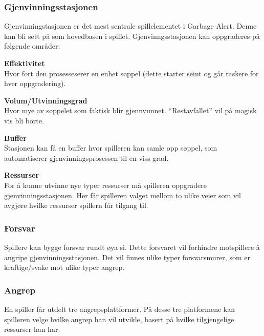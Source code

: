 \subsubsection{Gjenvinningsstasjonen}
Gjenvinningstasjonen er det mest sentrale spillelementet i Garbage
Alert. Denne kan bli sett på som hovedbasen i spillet.
Gjenvinngsstasjonen kan oppgraderes på følgende områder:\\
\begin{description}
	\item \textbf{Effektivitet}\\Hvor fort den prosesseserer en enhet søppel (dette starter seint og går raskere for hver oppgradering).
	\item \textbf{Volum/Utvinningsgrad}\\Hvor mye av søppelet som faktisk blir gjennvunnet. “Restavfallet” vil på magisk vis bli borte.
	\item \textbf{Buffer}\\Stasjonen kan få en buffer hvor spilleren kan samle opp søppel, som automatiserer gjenvinningsprosessen til en viss grad.
	\item \textbf{Ressurser}\\For å kunne utvinne nye typer ressurser må
		spilleren oppgradere gjenvinningsstasjonen. Her får spilleren valget
		mellom to ulike veier som vil avgjøre hvilke ressurser spillern får
		tilgang til.
\end{description}
\subsubsection{Forsvar}
Spillere kan bygge forsvar rundt øya si. Dette forsvaret vil forhindre
motspillere å angripe gjenvinningsstasjonen. Det vil finnes ulike typer
forsvarsmurer, som er kraftige/svake mot ulike typer angrep.
\subsubsection{Angrep}
En spiller får utdelt tre angrepsplattformer. På desse tre platformene
kan spilleren velge hvilke angrep han vil utvikle, basert på hvilke
tilgjengelige ressurser han har.
